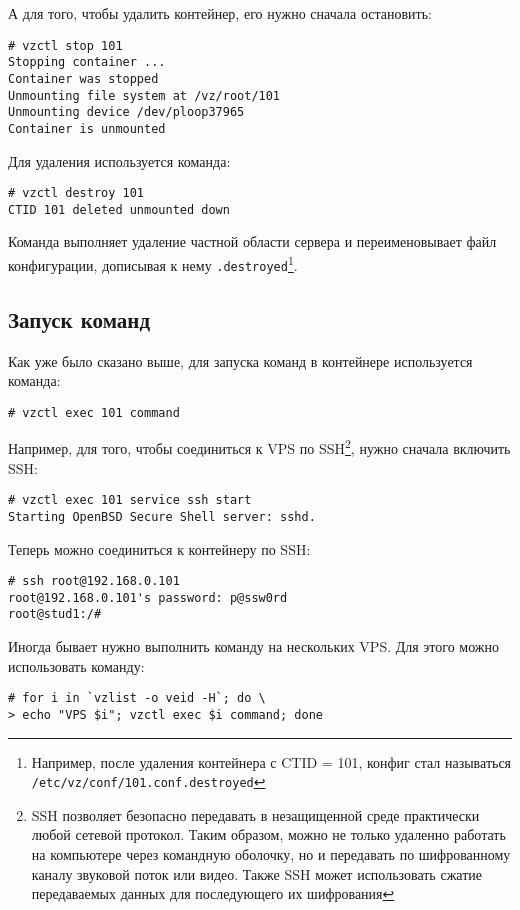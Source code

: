 А для того, чтобы удалить контейнер, его нужно сначала остановить:
\begin{lstlisting}
# vzctl stop 101
Stopping container ...
Container was stopped
Unmounting file system at /vz/root/101
Unmounting device /dev/ploop37965
Container is unmounted
\end{lstlisting}

Для удаления используется команда:
\begin{lstlisting}
# vzctl destroy 101
CTID 101 deleted unmounted down
\end{lstlisting}

Команда выполняет удаление частной области сервера и переименовывает файл конфигурации, дописывая к нему \texttt{.destroyed}\footnote{Например, после удаления контейнера с CTID = 101, конфиг стал называться \texttt{/etc/vz/conf/101.conf.destroyed}}.

\subsection{Запуск команд}
Как уже было сказано выше, для запуска команд в контейнере используется команда:
\begin{lstlisting}
# vzctl exec 101 command
\end{lstlisting}

Например, для того, чтобы соединиться к VPS по SSH\footnote{SSH позволяет безопасно передавать в незащищенной среде практически любой сетевой протокол. Таким образом, можно не только удаленно работать на компьютере через командную оболочку, но и передавать по шифрованному каналу звуковой поток или видео. Также SSH может использовать сжатие передаваемых данных для последующего их шифрования}, нужно сначала включить SSH:
\begin{lstlisting}
# vzctl exec 101 service ssh start
Starting OpenBSD Secure Shell server: sshd.
\end{lstlisting}

Теперь можно соединиться к контейнеру по SSH:
\begin{lstlisting}
# ssh root@192.168.0.101
root@192.168.0.101's password: p@ssw0rd
root@stud1:/# 
\end{lstlisting}

Иногда бывает нужно выполнить команду на нескольких VPS.
Для этого можно использовать команду:
\begin{lstlisting}
# for i in `vzlist -o veid -H`; do \
> echo "VPS $i"; vzctl exec $i command; done
\end{lstlisting}

